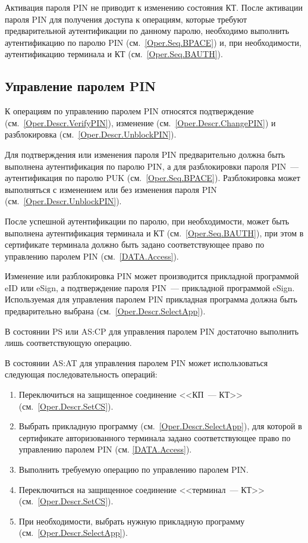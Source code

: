 Активация пароля PIN не приводит к изменению состояния КТ.
После активации пароля PIN для получения доступа к
операциям, которые требуют предварительной
аутентификации по данному паролю, необходимо выполнить аутентификацию 
по паролю PIN (см.~\ref{Oper.Seq.BPACE}) и, при необходимости, 
аутентификацию терминала и КТ (см.~\ref{Oper.Seq.BAUTH}).

\subsection{Управление паролем PIN}
\label{Oper.Seq.ControlPIN}

К операциям по управлению паролем PIN относятся
подтверждение (см.~\ref{Oper.Descr.VerifyPIN}),
изменение (см.~\ref{Oper.Descr.ChangePIN}) и
разблокировка (см.~\ref{Oper.Descr.UnblockPIN}).

Для подтверждения или изменения пароля PIN предварительно 
должна быть выполнена аутентификация по 
паролю PIN, а для разблокировки пароля PIN~---
аутентификация по паролю PUK (см.~\ref{Oper.Seq.BPACE}).
Разблокировка может выполняться с изменением или без 
изменения пароля PIN (см.~\ref{Oper.Descr.UnblockPIN}).

После успешной аутентификации по паролю,
при необходимости, может быть выполнена аутентификация 
терминала и КТ (см.~\ref{Oper.Seq.BAUTH}),
при этом в сертификате терминала должно быть задано соответствующее 
право по управлению паролем PIN (см.~\ref{DATA.Access}).

Изменение или разблокировка PIN может
производится прикладной программой eID или eSign,
а подтверждение пароля PIN~--- прикладной программой eSign.
Используемая для управления паролем PIN прикладная
программа должна быть предварительно 
выбрана (см.~\ref{Oper.Descr.SelectApp}). 

В состоянии PS или AS:CP для управления паролем PIN
достаточно выполнить лишь соответствующую операцию.

В состоянии AS:AT для управления паролем PIN может
использоваться следующая последовательность операций:
%
\begin{enumerate} 
\item Переключиться на защищенное соединение <<КП~--- КТ>> 
      (см.~\ref{Oper.Descr.SetCS}).
\item Выбрать прикладную программу (см.~\ref{Oper.Descr.SelectApp}),
      для которой в сертификате авторизованного терминала задано 
      соответствующее право по управлению паролем PIN (см. \ref{DATA.Access}).
\item Выполнить требуемую операцию по управлению паролем PIN.
\item Переключиться на защищенное соединение <<терминал~--- КТ>> 
      (см.~\ref{Oper.Descr.SetCS}).
\item При необходимости, выбрать нужную прикладную программу 
      (см.~\ref{Oper.Descr.SelectApp}).
\end{enumerate}


